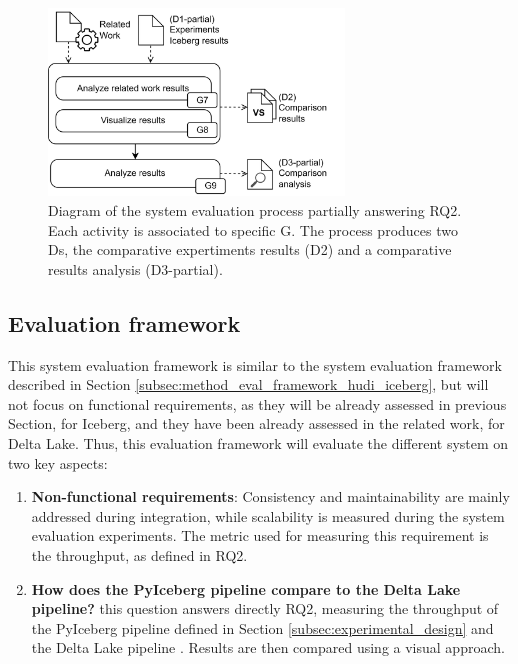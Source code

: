 \begin{figure}[!ht]
    \begin{center}
    \includegraphics[width=0.7\textwidth]{figures/3-method/method_comp.png}
    \caption[System evaluation process - Iceberg vs. Delta Lake]{Diagram of the system evaluation process partially answering \gls{RQ}2. Each activity is associated to specific \gls{G}. The process produces two \glspl{D}, the comparative expertiments results (\gls{D}2) and a comparative results analysis (\gls{D}3-partial).}
    \label{fig:method_comparison}
    \end{center}
\end{figure}



\subsection{Evaluation framework}
\label{subsec:method_eval_framework_iceberg_delta}

This system evaluation framework is similar to the system evaluation framework described in Section \ref{subsec:method_eval_framework_hudi_iceberg}, but will not focus on functional requirements, as they will be already assessed in previous Section, for Iceberg, and they have been already assessed in the related work, for Delta Lake. Thus, this evaluation framework will evaluate the different system on two key aspects:
\begin{enumerate}
    \item \textbf{Non-functional requirements}: Consistency and maintainability are mainly addressed during integration, while scalability is measured during the system evaluation experiments. The metric used for measuring this requirement is the throughput, as defined in \gls{RQ}2.
    \item \textbf{How does the PyIceberg pipeline compare to the Delta Lake pipeline?} this question answers directly \gls{RQ}2, measuring the throughput of the PyIceberg pipeline defined in Section \ref{subsec:experimental_design} and the Delta Lake pipeline \cite{manfrediReducingReadWrite2024}. Results are then compared using a visual approach.
\end{enumerate}


